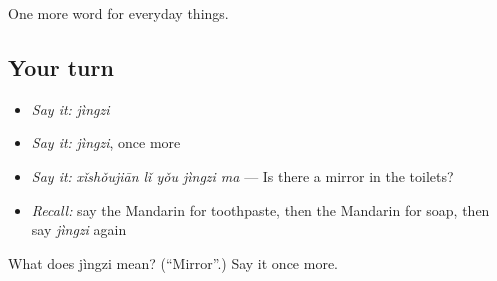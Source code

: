 \begin{grammarlens}[title={What you've built}]
One more word for everyday things.
\end{grammarlens}

\subsection*{Your turn}
\begin{itemize}
\raggedright
  \item \emph{Say it:} \emph{jìngzi}
  \item \emph{Say it:} \emph{jìngzi}, once more
  \item \emph{Say it:} \emph{xǐshǒujiān lǐ yǒu jìngzi ma} — Is there a mirror in the toilets?
  \item \emph{Recall:} say the Mandarin for toothpaste, then the Mandarin for soap, then say \emph{jìngzi} again
\end{itemize}

\begin{tcolorbox}[breakable,colback=teal!4,colframe=teal!35!black,title={Before you move on}]
What does jìngzi mean? (\textquotedblleft{}Mirror\textquotedblright{}.) Say it once more.
\end{tcolorbox}
